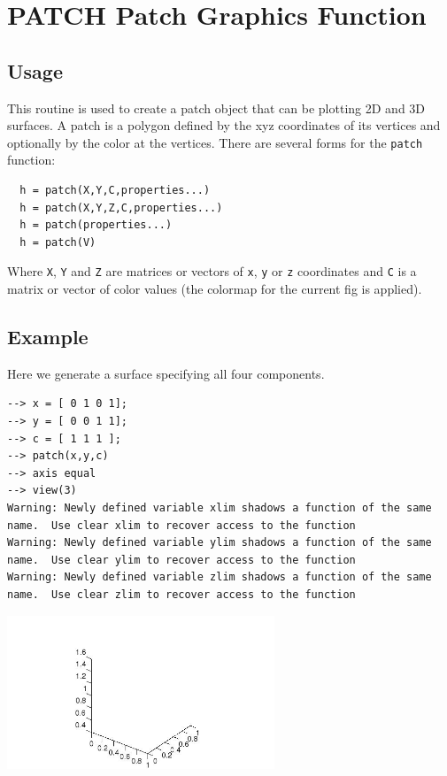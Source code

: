 \section{PATCH Patch Graphics Function
}

\subsection{Usage}

This routine is used to create a patch object that can be plotting 2D and 3D surfaces.  A 
patch is a polygon defined by the xyz coordinates
of its vertices and optionally by the color at the vertices.
There are several forms for the \verb|patch| function:
\begin{verbatim}
  h = patch(X,Y,C,properties...)
  h = patch(X,Y,Z,C,properties...)
  h = patch(properties...)
  h = patch(V)
\end{verbatim}
Where \verb|X|, \verb|Y| and \verb|Z| are matrices or vectors of \verb|x|, \verb|y| or \verb|z| coordinates
and \verb|C| is a matrix or vector of color values (the colormap
for the current fig is applied).  
\subsection{Example}

Here we generate a surface specifying all four components.
\begin{verbatim}
--> x = [ 0 1 0 1];
--> y = [ 0 0 1 1];
--> c = [ 1 1 1 ];
--> patch(x,y,c)
--> axis equal
--> view(3)
Warning: Newly defined variable xlim shadows a function of the same name.  Use clear xlim to recover access to the function
Warning: Newly defined variable ylim shadows a function of the same name.  Use clear ylim to recover access to the function
Warning: Newly defined variable zlim shadows a function of the same name.  Use clear zlim to recover access to the function
\end{verbatim}


\centerline{\includegraphics[width=8cm]{patch1}}

